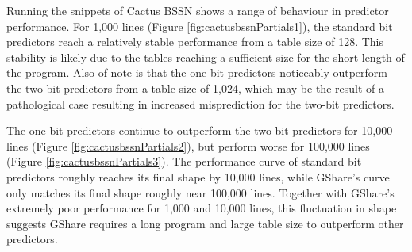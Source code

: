 \clearpage
Running the snippets of Cactus BSSN shows a range of behaviour in predictor performance. For 1,000 lines (Figure \ref{fig:cactusbssnPartials1}), the standard bit predictors reach a relatively stable performance from a table size of 128. This stability is likely due to the tables reaching a sufficient size for the short length of the program. Also of note is that the one-bit predictors noticeably outperform the two-bit predictors from a table size of 1,024, which may be the result of a pathological case resulting in increased misprediction for the two-bit predictors.

The one-bit predictors continue to outperform the two-bit predictors for 10,000 lines (Figure \ref{fig:cactusbssnPartials2}), but perform worse for 100,000 lines (Figure \ref{fig:cactusbssnPartials3}). The performance curve of standard bit predictors roughly reaches its final shape by 10,000 lines, while GShare's curve only matches its final shape roughly near 100,000 lines. Together with GShare's extremely poor performance for 1,000 and 10,000 lines, this fluctuation in shape suggests GShare requires a long program and large table size to outperform other predictors.

